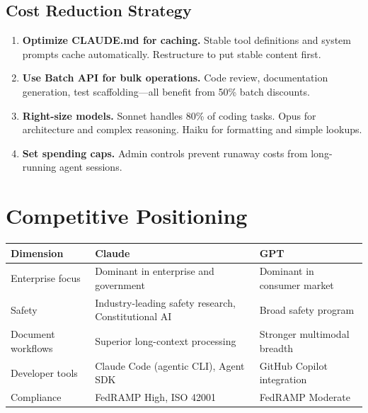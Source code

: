 \subsection{Cost Reduction Strategy}

\begin{enumerate}
  \item \textbf{Optimize CLAUDE.md for caching.}
    Stable tool definitions and system prompts cache automatically.
    Restructure to put stable content first.
  \item \textbf{Use Batch API for bulk operations.}
    Code review, documentation generation, test scaffolding---all benefit
    from 50\% batch discounts.
  \item \textbf{Right-size models.}
    Sonnet handles 80\% of coding tasks. Opus for architecture and complex reasoning.
    Haiku for formatting and simple lookups.
  \item \textbf{Set spending caps.}
    Admin controls prevent runaway costs from long-running agent sessions.
\end{enumerate}

\section{Competitive Positioning}
\label{sec:competitive}

\begin{fullwidth}
\begin{tabular}{@{}p{3cm}p{4cm}p{5cm}@{}}
\toprule
\textbf{Dimension} & \textbf{Claude} & \textbf{GPT} \\
\midrule
Enterprise focus & Dominant in enterprise and government & Dominant in consumer market \\
Safety & Industry-leading safety research, Constitutional AI & Broad safety program \\
Document workflows & Superior long-context processing & Stronger multimodal breadth \\
Developer tools & Claude Code (agentic CLI), Agent SDK & GitHub Copilot integration \\
Compliance & FedRAMP High, ISO 42001 & FedRAMP Moderate \\
\bottomrule
\end{tabular}
\end{fullwidth}


